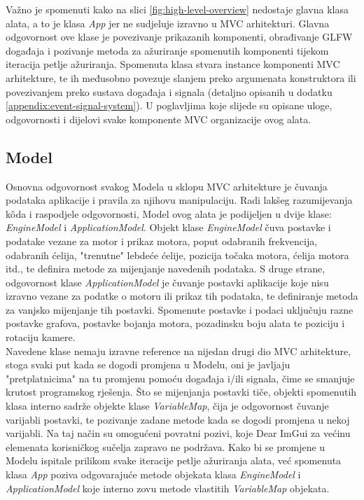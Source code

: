 \documentclass[times, utf8, diplomski]{fer}
\begin{document}
Važno je spomenuti kako na slici \ref{fig:high-level-overview} nedostaje glavna klasa alata, a to je klasa \textit{App} jer ne sudjeluje izravno u MVC arhitekturi. Glavna odgovornost ove klase je povezivanje prikazanih komponenti, obrađivanje GLFW događaja i pozivanje metoda za ažuriranje spomenutih komponenti tijekom iteracija petlje ažuriranja. Spomenuta klasa stvara instance komponenti MVC arhitekture, te ih međusobno povezuje slanjem preko argumenata konstruktora ili povezivanjem preko sustava događaja i signala (detaljno opisanih u dodatku \ref{appendix:event-signal-system}). U poglavljima koje slijede su opisane uloge, odgovornosti i dijelovi svake komponente MVC organizacije ovog alata.

\subsection{Model}
Osnovna odgovornost svakog Modela u sklopu MVC arhitekture je čuvanja podataka aplikacije i pravila za njihovu manipulaciju. Radi lakšeg razumijevanja k\^{o}da i raspodjele odgovornosti, Model ovog alata je podijeljen u dvije klase: \textit{EngineModel} i \textit{ApplicationModel}. Objekt klase \textit{EngineModel} čuva postavke i podatake vezane za motor i prikaz motora, poput odabranih frekvencija, odabranih ćelija, "trenutne" lebdeće ćelije, pozicija točaka motora, ćelija motora itd., te definira metode za mijenjanje navedenih podataka. S druge strane, odgovornost klase \textit{ApplicationModel} je čuvanje postavki aplikacije koje nisu izravno vezane za podatke o motoru ili prikaz tih podataka, te definiranje metoda za vanjsko mijenjanje tih postavki. Spomenute postavke i podaci uključuju razne postavke grafova, postavke bojanja motora, pozadinsku boju alata te poziciju i rotaciju kamere.\\

Navedene klase nemaju izravne reference na nijedan drugi dio MVC arhitekture, stoga svaki put kada se dogodi promjena u Modelu, oni je javljaju "pretplatnicima" na tu promjenu pomoću događaja i/ili signala, čime se smanjuje krutost programskog rješenja. Što se mijenjanja postavki tiče, objekti spomenutih klasa interno sadrže objekte klase \textit{VariableMap}, čija je odgovornost čuvanje varijabli postavki, te pozivanje zadane metode kada se dogodi promjena u nekoj varijabli. Na taj način su omogućeni povratni pozivi, koje Dear ImGui za većinu elemenata korisničkog sučelja zapravo ne podržava. Kako bi se promjene u Modelu ispitale prilikom svake iteracije petlje ažuriranja alata, već spomenuta klasa \textit{App} poziva odgovarajuće metode objekata klasa \textit{EngineModel} i \textit{ApplicationModel} koje interno zovu metode vlastitih \textit{VariableMap} objekata.
\end{document}
